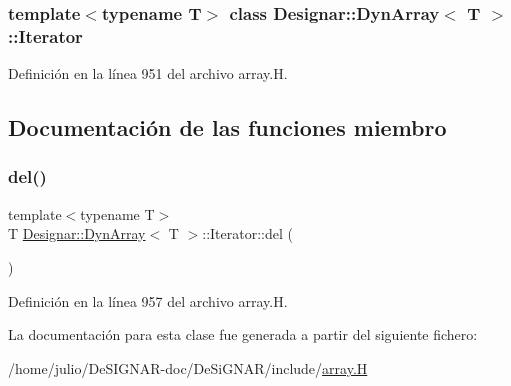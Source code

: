 \subsubsection*{template$<$typename T$>$\newline
class Designar\+::\+Dyn\+Array$<$ T $>$\+::\+Iterator}



Definición en la línea 951 del archivo array.\+H.



\subsection{Documentación de las funciones miembro}
\mbox{\label{class_designar_1_1_dyn_array_1_1_iterator_a3d700006f23d3c4b63e109edef32410f}} 
\subsubsection{\texorpdfstring{del()}{del()}}
{\footnotesize\ttfamily template$<$typename T$>$ \\
T \hyperlink{class_designar_1_1_dyn_array}{Designar\+::\+Dyn\+Array}$<$ T $>$\+::Iterator\+::del (\begin{DoxyParamCaption}{ }\end{DoxyParamCaption})\hspace{0.3cm}{\ttfamily [inline]}}



Definición en la línea 957 del archivo array.\+H.



La documentación para esta clase fue generada a partir del siguiente fichero\+:\begin{DoxyCompactItemize}
\item 
/home/julio/\+De\+S\+I\+G\+N\+A\+R-\/doc/\+De\+Si\+G\+N\+A\+R/include/\hyperlink{array_8_h}{array.\+H}\end{DoxyCompactItemize}
